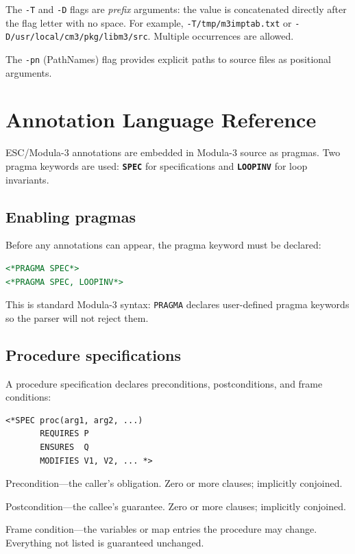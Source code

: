 \documentclass[11pt]{article}
\newcommand{\escm}{ESC/Modula-3}
\newcommand{\m}[1]{\texttt{#1}}
\newcommand{\kw}[1]{\texttt{\textbf{#1}}}
\begin{document}
The \m{-T} and \m{-D} flags are \emph{prefix} arguments: the value is
concatenated directly after the flag letter with no space.  For
example, \m{-T/tmp/m3imptab.txt} or \m{-D/usr/local/cm3/pkg/libm3/src}.
Multiple occurrences are allowed.

The \m{-pn} (PathNames) flag provides explicit paths to source files
as positional arguments.

\section{Annotation Language Reference}
\label{sec:annotations}

\escm{} annotations are embedded in Modula-3 source as pragmas.
Two pragma keywords are used: \kw{SPEC} for specifications and
\kw{LOOPINV} for loop invariants.

\subsection{Enabling pragmas}

Before any annotations can appear, the pragma keyword must be
declared:

\begin{lstlisting}[language=Modula3]
<*PRAGMA SPEC*>
<*PRAGMA SPEC, LOOPINV*>
\end{lstlisting}

This is standard Modula-3 syntax: \m{PRAGMA} declares user-defined
pragma keywords so the parser will not reject them.

\subsection{Procedure specifications}
\label{sec:procspec}

A procedure specification declares preconditions, postconditions, and
frame conditions:

\begin{lstlisting}[language=ESC]
<*SPEC proc(arg1, arg2, ...)
       REQUIRES P
       ENSURES  Q
       MODIFIES V1, V2, ... *>
\end{lstlisting}

\begin{description}[nosep,leftmargin=2em]
  \item[\kw{REQUIRES}] Precondition---the caller's obligation.  Zero
    or more clauses; implicitly conjoined.
  \item[\kw{ENSURES}] Postcondition---the callee's guarantee.  Zero
    or more clauses; implicitly conjoined.
  \item[\kw{MODIFIES}] Frame condition---the variables or map entries
    the procedure may change.  Everything not listed is guaranteed
    unchanged.
\end{description}
\end{document}
